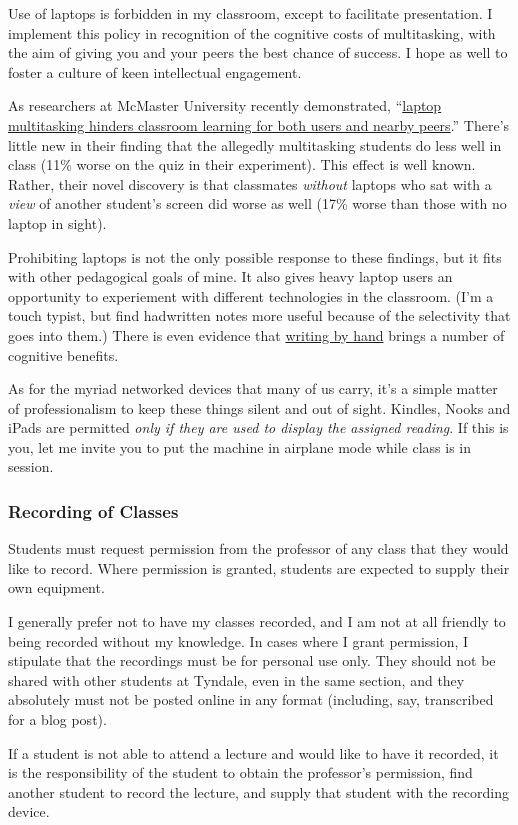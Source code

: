 Use of laptops is forbidden in my classroom, except to facilitate presentation.
I implement this policy in recognition of the cognitive costs of multitasking,
with the aim of giving you and your peers the best chance of success. I hope as
well to foster a culture of keen intellectual engagement.

As researchers at McMaster University recently demonstrated,
``\href{http://dx.doi.org/10.1016/j.compedu.2012.10.003}{laptop multitasking
hinders classroom learning for both users and nearby peers}.'' There's little
new in their finding that the allegedly multitasking students do less well in
class (11\% worse on the quiz in their experiment). This effect is well known.
Rather, their novel discovery is that classmates \emph{without} laptops who sat
with a \emph{view} of another student's screen did worse as well (17\% worse
than those with no laptop in sight).

Prohibiting laptops is not the only possible response to these findings,
but it fits with other pedagogical goals of mine. It also gives heavy
laptop users an opportunity to experiement with different technologies in
the classroom. (I'm a touch typist, but find hadwritten notes more useful
because of the selectivity that goes into them.) There is even evidence that
\href{http://on.wsj.com/pjtJaK}{writing by hand} brings a number of cognitive
benefits.

As for the myriad networked devices that many of us carry, it's a simple matter
of professionalism to keep these things silent and out of sight. Kindles, Nooks
and iPads are permitted \emph{only if they are used to display the assigned
reading}. If this is you, let me invite you to put the machine in airplane mode
while class is in session.

\subsubsection{Recording of Classes}
\label{recording}

Students must request permission from the professor of any class that they
would like to record. Where permission is granted, students are expected to
supply their own equipment.

I generally prefer not to have my classes recorded, and I am not at all
friendly to being recorded without my knowledge. In cases where I grant
permission, I stipulate that the recordings must be for personal use only. They
should not be shared with other students at Tyndale, even in the same section,
and they absolutely must not be posted online in any format (including, say,
transcribed for a blog post).

If a student is not able to attend a lecture and would like to have it
recorded, it is the responsibility of the student to obtain the professor's
permission, find another student to record the lecture, and supply that student
with the recording device.
